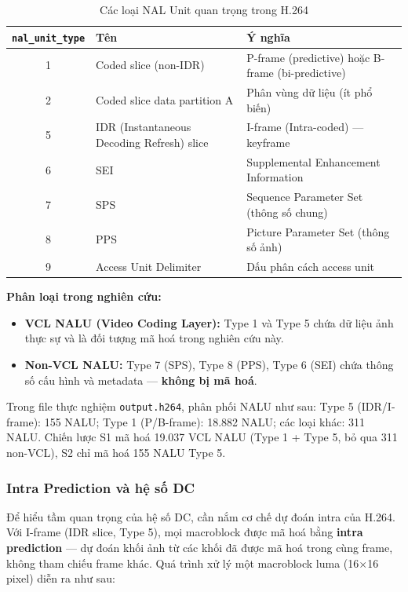 \begin{table}[ht]
\centering
\caption{Các loại NAL Unit quan trọng trong H.264}
\label{tab:nal_types}
\begin{tabular}{cll}
\toprule
\texttt{nal\_unit\_type} & Tên & Ý nghĩa \\
\midrule
1 & Coded slice (non-IDR) & P-frame (predictive) hoặc B-frame (bi-predictive) \\
2 & Coded slice data partition A & Phân vùng dữ liệu (ít phổ biến) \\
5 & IDR (Instantaneous Decoding Refresh) slice & I-frame (Intra-coded) --- keyframe \\
6 & SEI                   & Supplemental Enhancement Information \\
7 & SPS                   & Sequence Parameter Set (thông số chung) \\
8 & PPS                   & Picture Parameter Set (thông số ảnh) \\
9 & Access Unit Delimiter & Dấu phân cách access unit \\
\bottomrule
\end{tabular}
\end{table}

\textbf{Phân loại trong nghiên cứu:}
\begin{itemize}
  \item \textbf{VCL NALU (Video Coding Layer):} Type 1 và Type 5 chứa dữ liệu ảnh
        thực sự và là đối tượng mã hoá trong nghiên cứu này.
  \item \textbf{Non-VCL NALU:} Type 7 (SPS), Type 8 (PPS), Type 6 (SEI) chứa
        thông số cấu hình và metadata --- \textbf{không bị mã hoá}.
\end{itemize}

Trong file thực nghiệm \texttt{output.h264}, phân phối NALU như sau:
Type 5 (IDR/I-frame): 155 NALU; Type 1 (P/B-frame): 18.882 NALU; các loại khác: 311 NALU.
Chiến lược S1 mã hoá 19.037 VCL NALU (Type 1 + Type 5, bỏ qua 311 non-VCL),
S2 chỉ mã hoá 155 NALU Type 5.

\subsubsection{Intra Prediction và hệ số DC}

Để hiểu tầm quan trọng của hệ số DC, cần nắm cơ chế dự đoán intra của H.264.
Với I-frame (IDR slice, Type 5), mọi macroblock được mã hoá bằng \textbf{intra prediction}
--- dự đoán khối ảnh từ các khối đã được mã hoá trong cùng frame, không tham chiếu
frame khác. Quá trình xử lý một macroblock luma (16$\times$16 pixel) diễn ra như sau:

